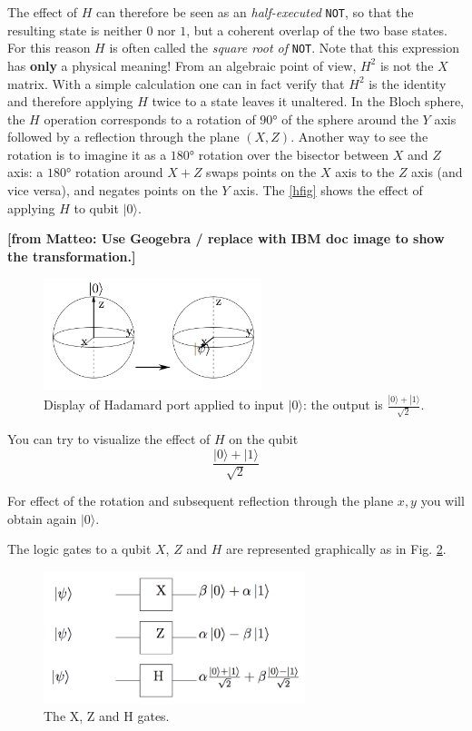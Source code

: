 \documentclass[a4paper,10pt]{article}
\newcommand{\from}[2]{{\bf[{\sc from #1:} #2]}}
\begin{document}
The effect of $H$ can therefore be seen as an \textit{half-executed} \texttt{NOT}, so that the resulting state is neither $0$ nor $1$, but a coherent overlap of the two base states. For this reason $H$ is often called the \textit{square root of} \texttt{NOT}. Note that this expression has \textbf{only} a physical meaning! From an algebraic point of view, $H^2$ is not the $X$ matrix. With a simple calculation one can in fact verify that $H^2$ is the identity and therefore applying $H$ twice to a state leaves it unaltered. In the Bloch sphere, the $H$ operation corresponds to a rotation of $\ang{90}$ of the sphere around the $Y$ axis followed by a reflection through the plane $(X, Z)$. Another way to see the rotation is to imagine it as a $\ang{180}$ rotation over the bisector between $X$ and $Z$ axis: a $\ang{180}$ rotation around $X+Z$ swaps points on the $X$ axis to the $Z$ axis (and vice versa), and negates points on the $Y$ axis. The \autoref{hfig} shows the effect of applying $H$ to qubit $|0\rangle$.

\from{Matteo}{Use Geogebra / replace with IBM doc image to show the transformation.}
\begin{figure}[!htb]
\begin{center}
\includegraphics[width=2.5in]{images/hfig.png}
\caption{Display of Hadamard port applied to input $|0\rangle$: the output is $\frac{|0\rangle + |1\rangle}{\sqrt{2}}$.}
\label{hfig}
\end{center}
\end{figure}

You can try to visualize the effect of $H$ on the qubit $$\frac{|0\rangle + |1\rangle}{\sqrt{2}}$$

For effect of the rotation and subsequent reflection through the plane $x, y$ you will obtain again $|0\rangle$.

The logic gates to a qubit $X$, $Z$ and $H$ are represented graphically as in Fig. \ref{qports}.

\begin{figure}[!htb]
\begin{center}
\includegraphics[width=3.0in]{images/qports.png}
\caption{The X, Z and H gates.}
\label{qports}
\end{center}
\end{figure}
\end{document}
